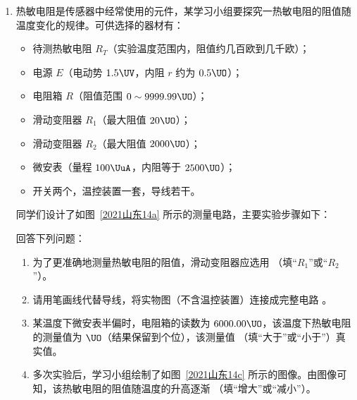 \documentclass[\gkver]{gaokaozhenti}
\begin{document}
\begin{enumerate}
\item
热敏电阻是传感器中经常使用的元件，某学习小组要探究一热敏电阻的阻值随温度变化的规律。可供选择的器材有：
\begin{itemize}
	\item
	待测热敏电阻 $R_{T}$（实验温度范围内，阻值约几百欧到几千欧）；
	\item
	电源 $E$（电动势 $1.5 \UV$，内阻 $r$ 约为 $0.5 \UO$）；
	\item
	电阻箱 $R$（阻值范围 $0 \sim 9999.99 \UO$）；
	\item
	滑动变阻器 $R_{1}$（最大阻值 $20 \UO$）；
	\item
	滑动变阻器 $R_{2}$（最大阻值 $2000 \UO$）；
	\item
	微安表（量程 $100 \UuA$，内阻等于 $2500 \UO$）；
	\item
	开关两个，温控装置一套，导线若干。
\end{itemize}

同学们设计了如图~\ref{2021山东14a} 所示的测量电路，主要实验步骤如下：

回答下列问题：
\begin{enumerate}
	\item
	为了更准确地测量热敏电阻的阻值，滑动变阻器应选用 （填“$R_{1}$”或“$R_{2}$”）。
	\item
	请用笔画线代替导线，将实物图（不含温控装置）连接成完整电路 \tkanswer[3cm]{}。
	\item
	某温度下微安表半偏时，电阻箱的读数为 $6000.00 \UO$，该温度下热敏电阻的测量值为  $\UO$（结果保留到个位），该测量值 （填“大于”或“小于”）真实值。
	\item
	多次实验后，学习小组绘制了如图~\ref{2021山东14c} 所示的图像。由图像可知，该热敏电阻的阻值随温度的升高逐渐 （填“增大”或“减小”）。
\end{enumerate}


\end{enumerate}
\end{document}
